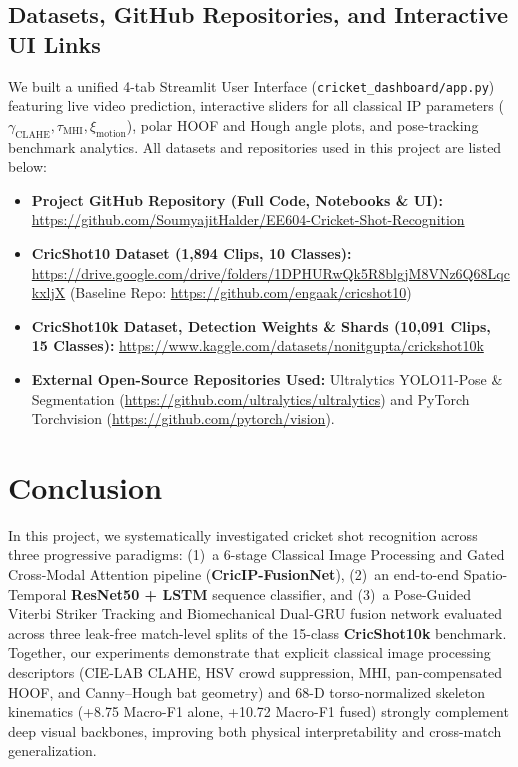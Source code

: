 \subsection{Datasets, GitHub Repositories, and Interactive UI Links}
We built a unified 4-tab Streamlit User Interface (\texttt{cricket\_dashboard/app.py}) featuring live video prediction, interactive sliders for all classical IP parameters ($\gamma_{\text{CLAHE}}, \tau_{\text{MHI}}, \xi_{\text{motion}}$), polar HOOF and Hough angle plots, and pose-tracking benchmark analytics. All datasets and repositories used in this project are listed below:
\begin{itemize}
    \item \textbf{Project GitHub Repository (Full Code, Notebooks \& UI):} \url{https://github.com/SoumyajitHalder/EE604-Cricket-Shot-Recognition}
    \item \textbf{CricShot10 Dataset (1,894 Clips, 10 Classes):} \url{https://drive.google.com/drive/folders/1DPHURwQk5R8blgjM8VNz6Q68LqckxljX} (Baseline Repo: \url{https://github.com/engaak/cricshot10})
    \item \textbf{CricShot10k Dataset, Detection Weights \& Shards (10,091 Clips, 15 Classes):} \url{https://www.kaggle.com/datasets/nonitgupta/crickshot10k}
    \item \textbf{External Open-Source Repositories Used:} Ultralytics YOLO11-Pose \& Segmentation (\url{https://github.com/ultralytics/ultralytics}) and PyTorch Torchvision (\url{https://github.com/pytorch/vision}).
\end{itemize}

\section{Conclusion}
\label{sec:conclusion}
In this project, we systematically investigated cricket shot recognition across three progressive paradigms: (1)~a 6-stage Classical Image Processing and Gated Cross-Modal Attention pipeline (\textbf{CricIP-FusionNet}), (2)~an end-to-end Spatio-Temporal \textbf{ResNet50 + LSTM} sequence classifier, and (3)~a Pose-Guided Viterbi Striker Tracking and Biomechanical Dual-GRU fusion network evaluated across three leak-free match-level splits of the 15-class \textbf{CricShot10k} benchmark. Together, our experiments demonstrate that explicit classical image processing descriptors (CIE-LAB CLAHE, HSV crowd suppression, MHI, pan-compensated HOOF, and Canny--Hough bat geometry) and 68-D torso-normalized skeleton kinematics (+8.75 Macro-F1 alone, +10.72 Macro-F1 fused) strongly complement deep visual backbones, improving both physical interpretability and cross-match generalization.
